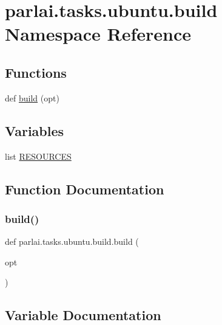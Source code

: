 \hypertarget{namespaceparlai_1_1tasks_1_1ubuntu_1_1build}{}\section{parlai.\+tasks.\+ubuntu.\+build Namespace Reference}
\label{namespaceparlai_1_1tasks_1_1ubuntu_1_1build}
\subsection*{Functions}
\begin{DoxyCompactItemize}
\item 
def \hyperlink{namespaceparlai_1_1tasks_1_1ubuntu_1_1build_aedbc80b48491ff9f08bbc5e82b9504a3}{build} (opt)
\end{DoxyCompactItemize}
\subsection*{Variables}
\begin{DoxyCompactItemize}
\item 
list \hyperlink{namespaceparlai_1_1tasks_1_1ubuntu_1_1build_a557702cb4284372e59f71bcfe7b0b324}{R\+E\+S\+O\+U\+R\+C\+ES}
\end{DoxyCompactItemize}


\subsection{Function Documentation}
\mbox{\label{namespaceparlai_1_1tasks_1_1ubuntu_1_1build_aedbc80b48491ff9f08bbc5e82b9504a3}} 
\subsubsection{\texorpdfstring{build()}{build()}}
{\footnotesize\ttfamily def parlai.\+tasks.\+ubuntu.\+build.\+build (\begin{DoxyParamCaption}\item[{}]{opt }\end{DoxyParamCaption})}



\subsection{Variable Documentation}
\mbox{\label{namespaceparlai_1_1tasks_1_1ubuntu_1_1build_a557702cb4284372e59f71bcfe7b0b324}} 
